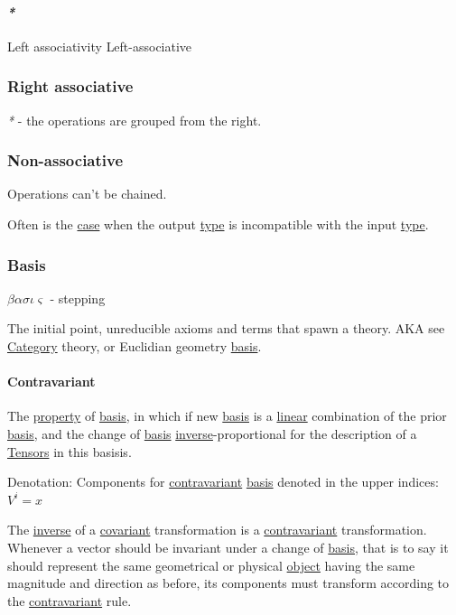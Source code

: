 \documentclass[a4paper,14pt,oneside]{book}
\begin{document}
\paragraph{\emph{*}}
\label{sec:org1d242c1}

\label{org710496e}Left associativity
\label{orga01fc50}Left-associative

\subsubsection{\label{orgdd9b9f3}Right associative}
\label{sec:org3855305}
\emph{*} - the operations are grouped from the right.

\subsubsection{\label{org1c847a8}Non-associative}
\label{sec:org53008ec}
Operations can't be chained.

Often is the \hyperref[org3a5c901]{case} when the output \hyperref[org84bd6a1]{type} is incompatible with the input \hyperref[org84bd6a1]{type}.

\subsubsection{\label{orgb226112}Basis}
\label{sec:org95cc9bf}
\(\beta\alpha\sigma\iota\varsigma\) - stepping

The initial point, unreducible axioms and terms that spawn a theory.
AKA see \hyperref[org78b3e97]{Category} theory, or Euclidian geometry \hyperref[orgb226112]{basis}.

\paragraph{\label{orgb3cb4b9}Contravariant}
\label{sec:orged2d1e7}
The \hyperref[org4e667e9]{property} of \hyperref[orgb226112]{basis}, in which if new \hyperref[orgb226112]{basis} is a \hyperref[org0e65204]{linear} combination of the prior \hyperref[orgb226112]{basis}, and the change of \hyperref[orgb226112]{basis} \hyperref[orga459037]{inverse}-proportional for the description of a \hyperref[org7dd1696]{Tensors} in this basisis.

Denotation:
Components for \hyperref[orgb3cb4b9]{contravariant} \hyperref[orgb226112]{basis} denoted in the upper indices:
\(V^{i} = x\)

The \hyperref[orga459037]{inverse} of a \hyperref[orgf15b9c7]{covariant} transformation is a \hyperref[orgb3cb4b9]{contravariant} transformation. Whenever a vector should be invariant under a change of \hyperref[orgb226112]{basis}, that is to say it should represent the same geometrical or physical \hyperref[org392e9c0]{object} having the same magnitude and direction as before, its components must transform according to the \hyperref[orgb3cb4b9]{contravariant} rule.
\end{document}
